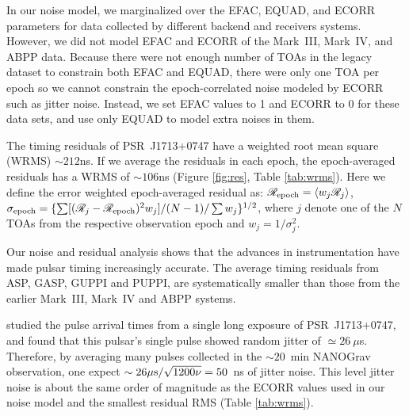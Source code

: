 {In our noise model, we marginalized over the EFAC, EQUAD, and ECORR parameters
for data collected by different backend and receivers systems. However, we did not model 
EFAC and ECORR of the Mark~III, Mark~IV, and ABPP data. Because there were not
enough number of TOAs in the legacy dataset to constrain both EFAC and EQUAD,
there were only one TOA per epoch so we cannot constrain the epoch-correlated
noise modeled by ECORR such as jitter noise. Instead, we set EFAC values to 1
and ECORR to 0 for these data sets, and use only EQUAD to model extra noises
in them.


The timing residuals of PSR~J1713+0747 have a weighted root mean square (WRMS)
$\sim 212$ns.
If we average the residuals in each epoch, the epoch-averaged residuals has a 
WRMS of $\sim 106$ns (Figure \ref{fig:res}, Table \ref{tab:wrms}).
Here we define the error weighted epoch-averaged residual as: 
$\mathscr{R}_{\rm epoch} = \langle w_j\mathscr{R}_{j}\rangle$, $\sigma_{\rm
epoch}=\{\sum [(\mathscr{R}_j-\mathscr{R}_{\rm epoch})^2w_j]/(N-1)/\sum w_j\}^{1/2}$, where $j$
denote one of the $N$ TOAs from the respective observation epoch and
$w_j=1/\sigma_j^2$.

Our noise and residual analysis shows that the advances in
instrumentation have made pulsar timing increasingly accurate.
The average timing residuals from ASP, GASP, GUPPI and PUPPI, are
systematically smaller than those from the earlier Mark~III, Mark~IV and ABPP
systems.

\citet{sc12} studied the pulse arrival times from a single long exposure of
PSR~J1713+0747, and found that this pulsar's single pulse showed random jitter of
$\simeq26~\mu$s. Therefore, by averaging many pulses collected in the
$\sim20$~min NANOGrav observation, one expect $\sim26\mu{\rm s}/\sqrt{1200\nu}=50$~ns of jitter noise. 
This level jitter noise is about the same order of magnitude as the ECORR values used in our noise model and the smallest residual RMS (Table \ref{tab:wrms}). 

}

